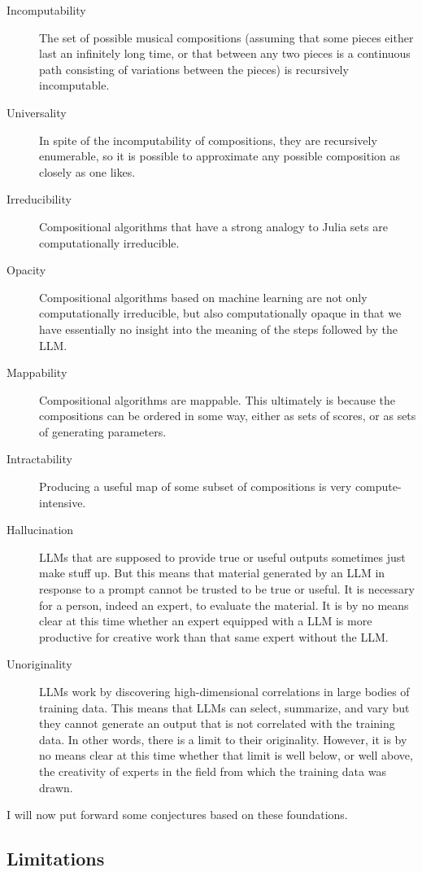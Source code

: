 \documentclass[11pt]{scrartcl}
\begin{document}
\begin{description}
\item[Incomputability] The set of possible musical compositions (assuming that some pieces either last an infinitely long time, or that between any two pieces is a continuous path consisting of variations between the pieces) is recursively incomputable.
\item[Universality] In spite of the incomputability of compositions, they are recursively enumerable, so it is possible to approximate any possible composition as closely as one likes.
\item[Irreducibility] Compositional algorithms that have a strong analogy to Julia sets are computationally irreducible.
\item[Opacity] Compositional algorithms based on machine learning are not only computationally irreducible, but also computationally opaque in that we have essentially no insight into the meaning of the steps followed by the LLM.
\item[Mappability] Compositional algorithms are mappable. This ultimately is because the compositions can be ordered in some way, either as sets of scores, or as sets of generating parameters.
\item[Intractability] Producing a useful map of some subset of compositions is very compute-intensive. 
\item[Hallucination] LLMs that are supposed to provide true or useful outputs sometimes just make stuff up. But this means that material generated by an LLM in response to a prompt cannot be trusted to be true or useful. It is necessary for a person, indeed an expert, to evaluate the material. It is by no means clear at this time whether an expert equipped with a LLM is more productive for creative work than that same expert without the LLM.
\item[Unoriginality] LLMs work by discovering high-dimensional correlations in large bodies of training data. This means that LLMs can select, summarize, and vary but they cannot generate an output that is not correlated with the training data. In other words, there is a limit to their originality. However, it is by no means clear at this time whether that limit is well below, or well above, the creativity of experts in the field from which the training data was drawn.
\end{description}

I will now put forward some conjectures based on these foundations.

\subsection*{Limitations}
\end{document}
